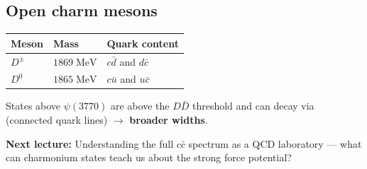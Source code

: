 \subsection{Open charm mesons}

\vspace{4pt}
\begin{center}
\begin{tabular}{C{2cm} C{3cm} C{5cm}}
  \toprule
  \color{white}\textbf{Meson} &
  \color{white}\textbf{Mass} &
  \color{white}\textbf{Quark content} \\
  \midrule
  $D^\pm$ & $1869\;\mathrm{MeV}$ & $c\bar{d}$ and $d\bar{c}$ \\
  $D^0$   & $1865\;\mathrm{MeV}$ & $c\bar{u}$ and $u\bar{c}$ \\
  \bottomrule
\end{tabular}
\end{center}
\vspace{6pt}

States above $\psi(3770)$ are above the $D\bar{D}$ threshold and can decay via
 (connected quark lines) $\to$ \textbf{broader widths}.

\begin{notebox}
  \textbf{Next lecture:} Understanding the full $c\bar{c}$ spectrum as a QCD laboratory
  --- what can charmonium states teach us about the strong force potential?
\end{notebox}
